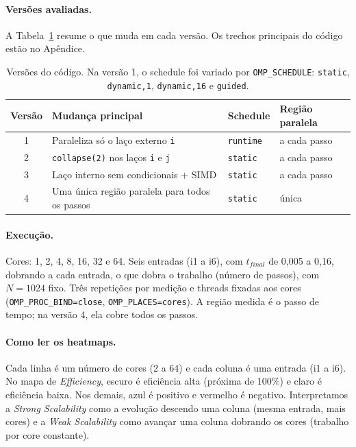 \documentclass[a4paper,12pt]{article}
\begin{document}
\paragraph{Versões avaliadas.} A Tabela~\ref{tab:versoes} resume o que muda em
cada versão. Os trechos principais do código estão no Apêndice.

\begin{table}[h]
\centering
\begin{tabular}{@{}clll@{}}
\toprule
Versão & Mudança principal & Schedule & Região paralela \\
\midrule
1 & Paraleliza só o laço externo \texttt{i} & \texttt{runtime} & a cada passo \\
2 & \texttt{collapse(2)} nos laços \texttt{i} e \texttt{j} & \texttt{static} & a cada passo \\
3 & Laço interno sem condicionais + SIMD & \texttt{static} & a cada passo \\
4 & Uma única região paralela para todos os passos & \texttt{static} & única \\
\bottomrule
\end{tabular}
\caption{Versões do código. Na versão 1, o schedule foi variado por
\texttt{OMP\_SCHEDULE}: \texttt{static}, \texttt{dynamic,1}, \texttt{dynamic,16}
e \texttt{guided}.}
\label{tab:versoes}
\end{table}

\paragraph{Execução.} Cores: 1, 2, 4, 8, 16, 32 e 64. Seis entradas
(i1 a i6), com $t_{final}$ de 0,005 a 0,16, dobrando a cada entrada, o que
dobra o trabalho (número de passos), com $N = 1024$ fixo. Três repetições
por medição e threads fixadas aos cores
(\texttt{OMP\_PROC\_BIND=close}, \texttt{OMP\_PLACES=cores}). A região medida é
o passo de tempo; na versão 4, ela cobre todos os passos.

\paragraph{Como ler os heatmaps.} Cada linha é um número de cores (2 a 64) e
cada coluna é uma entrada (i1 a i6). No mapa de \emph{Efficiency}, escuro é
eficiência alta (próxima de 100\%) e claro é eficiência baixa. Nos demais, azul é
positivo e vermelho é negativo. Interpretamos a \emph{Strong Scalability} como
a evolução descendo uma coluna (mesma entrada, mais cores) e a
\emph{Weak Scalability} como avançar uma coluna dobrando os cores (trabalho por
core constante).
\end{document}
